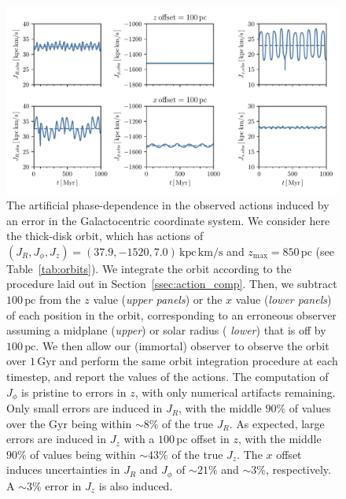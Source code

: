 \documentclass[twocolumn]{aastex62}
\newcommand{\pc}{\text{pc}}
\newcommand{\Gyr}{\text{Gyr}}
\newcommand{\kms}{\text{km}/\text{s}}
\newcommand{\actunit}{\text{kpc}\,\kms}
\begin{document}
\begin{figure}
\begin{center}
\includegraphics[width=\textwidth]{fig/schmactions_one_orbit.pdf}
\end{center}
\caption{The artificial phase-dependence in the observed actions induced by an
error in the Galactocentric coordinate system. We consider here the thick-disk
orbit, which has actions of $(J_R, J_{\phi}, J_z) = (37.9, -1520, 7.0)\,\actunit$
and $z_{\text{max}}=850\,\pc$ (see Table~\ref{tab:orbits}). We integrate the
orbit according to the procedure laid out in Section~\ref{ssec:action_comp}.
Then, we subtract $100\,\pc$ from the $z$ value ({\em upper panels}) or the
$x$ value ({\em lower panels}) of each position in the orbit, corresponding to
an erroneous observer assuming a midplane ({\em upper}) or solar radius ({\em
lower}) that is off by $100\,\pc$. We then allow our (immortal) observer to
observe the orbit over $1\,\Gyr$ and perform the same orbit integration
procedure at each timestep, and report the values of the actions. The
computation of $J_{\phi}$ is pristine to errors in $z$, with only numerical
artifacts remaining. Only small errors are induced in $J_R$, with the middle
$90\%$ of values over the $\Gyr$ being within $\sim8\%$ of the true $J_R$. As
expected, large errors are induced in $J_z$ with a $100\,\pc$ offset in $z$,
with the middle $90\%$ of values being within $\sim43\%$ of the true $J_z$.
The $x$ offset induces uncertainties in $J_R$ and $J_{\phi}$ of $\sim21\%$ and
$\sim3\%$, respectively. A $\sim3\%$ error in $J_z$ is also induced.}
\label{fig:one_orbit_wrong_ref}
\end{figure}
\end{document}
